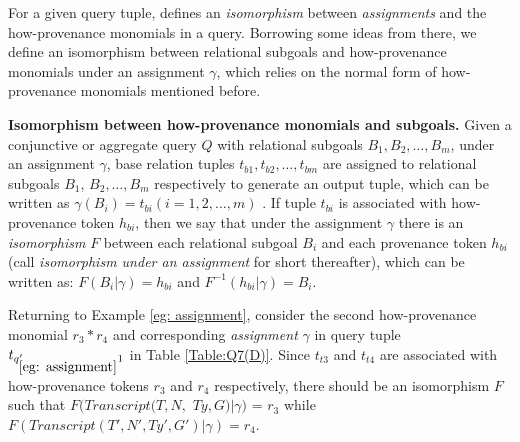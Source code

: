 For a given query tuple, \cite{amsterdamer2012provenance} defines an \textit{isomorphism} between {\em assignments} and the how-provenance monomials in a query. Borrowing some ideas from there, we define an isomorphism between relational subgoals and how-provenance monomials under an assignment $\gamma$, which relies on the normal form of how-provenance monomials mentioned before.

\begin{definition}
{\bf Isomorphism between how-provenance monomials and subgoals.}  Given a conjunctive or aggregate query $Q$ with relational subgoals $B_1, B_2, \dots, B_m$,
\eat{\begin{tabbing}
\noindent
{\tt $Q(X_1, X_2,\dots, X_t) :- B_1, B_2, \dots, B_m, condition(Q)$}
\end{tabbing}}
under an assignment $\gamma$, base relation tuples $t_{b1}, t_{b2}, \dots, t_{bm}$ are assigned to relational subgoals $B_1$, $B_2, \dots, B_m$ respectively to generate an output tuple, which can be written as $\gamma(B_i) = t_{bi} (i=1,2,\dots, m)$ \cite{amsterdamer2011provenance}. If tuple $t_{bi}$ is associated with how-provenance token $h_{bi}$, then we say that under the assignment $\gamma$ there is an {\em isomorphism} $F$ between each relational subgoal $B_i$ and each provenance token $h_{bi}$ (call {\em isomorphism under an assignment} for short thereafter), which can be written as: $F(B_i|\gamma) = h_{bi}$ and $F^{-1}(h_{bi}|\gamma) = B_i$.
\end{definition}

Returning to Example \ref{eg: assignment}, consider the second how-provenance monomial $r_3*r_4$ and corresponding {\em assignment} $\gamma$ in query tuple $t_{q_{\ref{eg: assignment}}'1}$ in Table \ref{Table:Q7(D)}. Since $t_{t3}$ and $t_{t4}$ are associated with how-provenance tokens $r_3$ and $r_4$ respectively, there should be an isomorphism $F$ such that $F(Transcript(T, N,$ $Ty, G)|\gamma)$ = $r_3$ while $F(Transcript(T', N', Ty', G')|\gamma) = r_4$.



